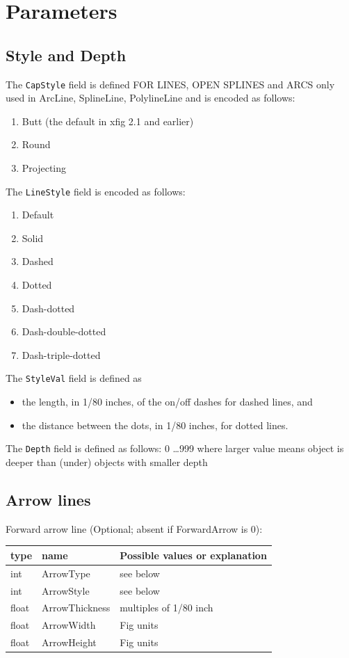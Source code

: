 \documentclass[10pt, a4paper, english]{article}%
\begin{document}
\section{Parameters}\label{sec:param}

\subsection{Style and Depth}\label{subsec:styDep}

The \texttt{CapStyle} field is defined FOR LINES, OPEN SPLINES and ARCS only 
used in ArcLine, SplineLine, PolylineLine
and is encoded as follows:
%
\begin{enumerate}
\item[0] Butt (the default in xfig 2.1 and earlier)
\item    Round
\item    Projecting
\end{enumerate}

\noindent
The \texttt{LineStyle} field is encoded as follows:
%
\begin{enumerate}
\item[-1] Default
\item[0]  Solid
\item     Dashed
\item     Dotted
\item     Dash-dotted
\item     Dash-double-dotted
\item     Dash-triple-dotted
\end{enumerate}

\noindent
The \texttt{StyleVal} field is defined as 
%
\begin{itemize}
\item
the length, in 1/80 inches, of the on/off dashes for dashed lines, and 
\item
the distance between the dots, in 1/80 inches, for dotted lines.
\end{itemize}

\noindent
The \texttt{Depth} field is defined as follows:
0 \ldots 999 where larger value means object is deeper than (under)
objects with smaller depth

\subsection{Arrow lines}\label{subsec:paramArrowLines}

Forward arrow line (Optional; absent if ForwardArrow is 0): \\
%
\begin{tabular}{lll}
\toprule
type & name & Possible values or explanation \\
\midrule
\midrule
int    & ArrowType      & see below \\
int    & ArrowStyle     & see below \\
float  & ArrowThickness & multiples of 1/80 inch \\
float  & ArrowWidth     & Fig units \\
float  & ArrowHeight    & Fig units \\
\bottomrule
\end{tabular}
\end{document}

